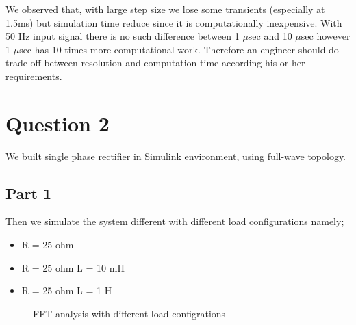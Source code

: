 \documentclass[fleqn, a4paper]{article}
\begin{document}
We observed that, with large step size we lose some transients (especially at 1.5ms) but simulation time reduce since it is computationally inexpensive. With 50 Hz input signal there is no such difference between 1 $\mu$sec and 10 $\mu$sec however 1 $\mu$sec has 10 times more computational work. Therefore an engineer should do trade-off between resolution and computation time according his or her requirements.  
\section*{Question 2}
We built single phase rectifier in Simulink environment, using full-wave topology. 
\subsection*{Part 1}
Then we simulate the system different with different load configurations namely;
\begin{itemize}
	\item R = 25 ohm
	\item R = 25 ohm L = 10 mH
	\item R = 25 ohm L = 1 H
\end{itemize}
\begin{figure}[H]%
    \centering
    \qquad
    \qquad
    \caption{FFT analysis with different load configrations}%
    \label{fig:example}%
\end{figure}
\end{document}
